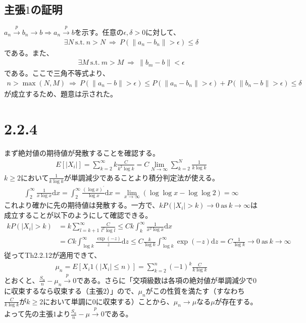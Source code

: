 \documentclass{article}
\begin{document}
\subsection{主張$1$の証明}
$a_n \xrightarrow{p} b_n \to b \Rightarrow a_n \xrightarrow{p} b$を示す。任意の$\epsilon, \delta > 0$に対して、
\begin{align*}
	\exists N\ \text{s.t.}\ n > N\ \Rightarrow\ P(\| a_n -b_n \| > \epsilon) \leq \delta
\end{align*}
である。また、
\begin{align*}
	\exists M\ \text{s.t.}\ m > M\ \Rightarrow\ \|b_m-b\| < \epsilon
\end{align*}
である。ここで三角不等式より、
\begin{align*}
	n > \max(N,M)\ \Rightarrow\ P\left( \| a_n - b \| > \epsilon \right) \leq P\left( \| a_n - b_n \| > \epsilon \right) + P\left( \| b_n - b \| > \epsilon \right) \leq \delta
\end{align*}
が成立するため、題意は示された。

\section{2.2.4}
まず絶対値の期待値が発散することを確認する。
\begin{align*}
	E\left[ |X_i| \right] = \sum_{k = 2}^{\infty} k \frac{C}{k^2 \log k} = C \lim_{N \to \infty} \sum_{k = 2}^{N} \frac{1}{k \log k}
\end{align*}
$k \geq 2$において$\frac{1}{k \log k}$が単調減少であることより積分判定法が使える。
\begin{align*}
	\int_2^{\infty} \frac{1}{x\log x} \mathrm{d}x = \int_2^{\infty} \frac{\left( \log x \right)^{\prime}}{\log x} \mathrm{d}x = \lim_{x\to \infty}\left( \log \log x  - \log \log 2 \right)= \infty
\end{align*}
これより確かに先の期待値は発散する。一方で、$k P\left( |X_i| > k \right) \to 0\ \text{as}\ k \to \infty$は成立することが以下のようにして確認できる。
\begin{align*}
	k P\left( |X_i| > k \right) &= k \sum_{l = k+1}^{\infty} \frac{C}{l^2 \log l} \leq Ck \int_k^{\infty} \frac{1}{x^2 \log x} \mathrm{d}x\\
	&= Ck \int_{\log k}^{\infty} \frac{\exp(-z)}{z} \mathrm{d}z \leq C \frac{k}{\log k} \int_{\log k}^{\infty} \exp(-z) \mathrm{d}z = C \frac{1}{\log k} \to 0\ \text{as}\ k \to \infty
\end{align*}
従ってTh2.2.12が適用できて、
\begin{align*}
	\mu_n = E\left[ X_i 1\left( |X_i| \leq n \right) \right] = \sum_{k = 2}^{n} (-1)^k \frac{C}{k \log k}
\end{align*}
とおくと、$\frac{S_n}{n} - \mu_n \xrightarrow{p} 0$である。さらに「交項級数は各項の絶対値が単調減少で$0$に収束するなら収束する（主張$2$）」ので、$\mu_n$がこの性質を満たす（すなわち$\frac{C}{k\log k}$が$k \geq2$において単調に$0$に収束する）ことから、$\mu_n \to \mu$なる$\mu$が存在する。よって先の主張$1$より$\frac{S_n}{n} - \mu \xrightarrow{p} 0$である。
\end{document}
